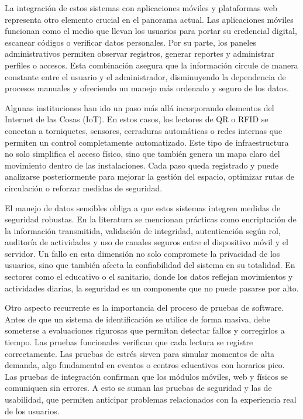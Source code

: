 

La integración de estos sistemas con aplicaciones móviles y plataformas web representa otro elemento crucial en el panorama actual. Las aplicaciones móviles funcionan como el medio que llevan los usuarios para portar su credencial digital, escanear códigos o verificar datos personales. Por su parte, los paneles administrativos permiten observar registros, generar reportes y administrar perfiles o accesos. Esta combinación asegura que la información circule de manera constante entre el usuario y el administrador, disminuyendo la dependencia de procesos manuales y ofreciendo un manejo más ordenado y seguro de los datos.

Algunas instituciones han ido un paso más allá incorporando elementos del Internet de las Cosas (IoT). En estos casos, los lectores de QR o RFID se conectan a torniquetes, sensores, cerraduras automáticas o redes internas que permiten un control completamente automatizado. Este tipo de infraestructura no solo simplifica el acceso físico, sino que también genera un mapa claro del movimiento dentro de las instalaciones. Cada paso queda registrado y puede analizarse posteriormente para mejorar la gestión del espacio, optimizar rutas de circulación o reforzar medidas de seguridad.

El manejo de datos sensibles obliga a que estos sistemas integren medidas de seguridad robustas. En la literatura se mencionan prácticas como encriptación de la información transmitida, validación de integridad, autenticación según rol, auditoría de actividades y uso de canales seguros entre el dispositivo móvil y el servidor. Un fallo en esta dimensión no solo compromete la privacidad de los usuarios, sino que también afecta la confiabilidad del sistema en su totalidad. En sectores como el educativo o el sanitario, donde los datos reflejan movimientos y actividades diarias, la seguridad es un componente que no puede pasarse por alto.

Otro aspecto recurrente es la importancia del proceso de pruebas de software. Antes de que un sistema de identificación se utilice de forma masiva, debe someterse a evaluaciones rigurosas que permitan detectar fallos y corregirlos a tiempo. Las pruebas funcionales verifican que cada lectura se registre correctamente. Las pruebas de estrés sirven para simular momentos de alta demanda, algo fundamental en eventos o centros educativos con horarios pico. Las pruebas de integración confirman que los módulos móviles, web y físicos se comuniquen sin errores. A esto se suman las pruebas de seguridad y las de usabilidad, que permiten anticipar problemas relacionados con la experiencia real de los usuarios.

